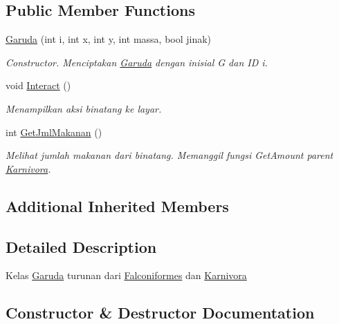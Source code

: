\subsection*{Public Member Functions}
\begin{DoxyCompactItemize}
\item 
\hyperlink{classGaruda_ae2c20d77a5f7d0d255f32fd2b71f76ee}{Garuda} (int i, int x, int y, int massa, bool jinak)
\begin{DoxyCompactList}\small\item\em Constructor. Menciptakan \hyperlink{classGaruda}{Garuda} dengan inisial \textquotesingle{}G\textquotesingle{} dan ID i. \end{DoxyCompactList}\item 
void \hyperlink{classGaruda_a16d407fcd0ff9fc879641de679cbc456}{Interact} ()\hypertarget{classGaruda_a16d407fcd0ff9fc879641de679cbc456}{}\label{classGaruda_a16d407fcd0ff9fc879641de679cbc456}

\begin{DoxyCompactList}\small\item\em Menampilkan aksi binatang ke layar. \end{DoxyCompactList}\item 
int \hyperlink{classGaruda_a66653e83dc102c16d2a8c99cad247075}{Get\+Jml\+Makanan} ()
\begin{DoxyCompactList}\small\item\em Melihat jumlah makanan dari binatang. Memanggil fungsi Get\+Amount parent \hyperlink{classKarnivora}{Karnivora}. \end{DoxyCompactList}\end{DoxyCompactItemize}
\subsection*{Additional Inherited Members}


\subsection{Detailed Description}
Kelas \hyperlink{classGaruda}{Garuda} turunan dari \hyperlink{classFalconiformes}{Falconiformes} dan \hyperlink{classKarnivora}{Karnivora} 

\subsection{Constructor \& Destructor Documentation}
